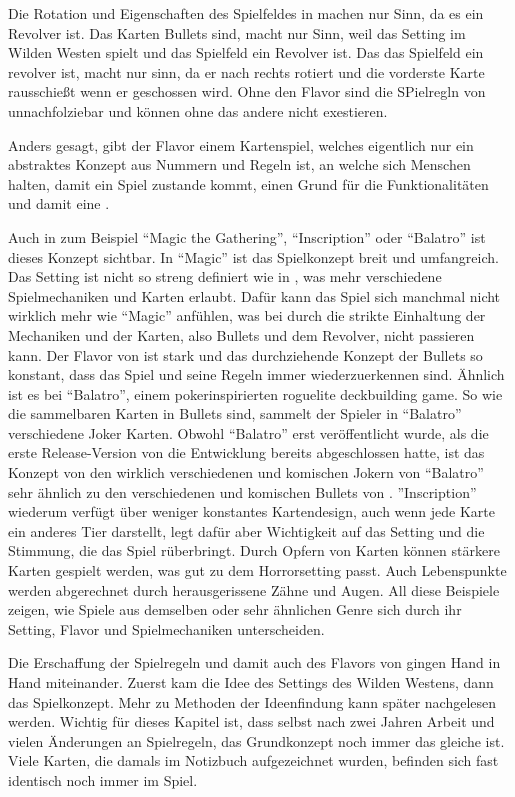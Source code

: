 Die Rotation und Eigenschaften des Spielfeldes in \FF machen nur Sinn, da es ein Revolver ist.
Das Karten Bullets sind, macht nur Sinn, weil das Setting im Wilden Westen spielt und das Spielfeld ein Revolver ist.
Das das Spielfeld ein revolver ist, macht nur sinn, da er nach rechts rotiert und die vorderste Karte rausschießt wenn er geschossen wird.
Ohne den Flavor sind die SPielregln von \FF unnachfolziebar und können ohne das andere nicht exestieren.


Anders gesagt, gibt der Flavor einem Kartenspiel, welches eigentlich nur ein abstraktes Konzept aus Nummern und Regeln ist,
an welche sich Menschen halten, damit ein Spiel zustande kommt, einen Grund für die Funktionalitäten und damit eine .


Auch in zum Beispiel “Magic the Gathering”, “Inscription” oder “Balatro” ist dieses Konzept sichtbar. In “Magic” ist das Spielkonzept breit und umfangreich.
Das Setting ist nicht so streng definiert wie in \FF, was mehr verschiedene Spielmechaniken und Karten erlaubt.
Dafür kann das Spiel sich manchmal nicht wirklich mehr wie “Magic” anfühlen,
was bei \FF durch die strikte Einhaltung der Mechaniken und der Karten, also Bullets und dem Revolver, nicht passieren kann.
Der Flavor von \FF ist stark und das durchziehende Konzept der Bullets so konstant, dass das Spiel und seine Regeln immer
wiederzuerkennen sind. Ähnlich ist es bei “Balatro”, einem pokerinspirierten roguelite deckbuilding game.
So wie die sammelbaren Karten in \FF Bullets sind, sammelt der Spieler in “Balatro” verschiedene Joker Karten.
Obwohl “Balatro” erst veröffentlicht wurde, als die erste Release-Version von \FF die Entwicklung bereits abgeschlossen hatte,
ist das Konzept von den wirklich verschiedenen und komischen Jokern von “Balatro” sehr ähnlich zu den verschiedenen und
komischen Bullets von \FF.
”Inscription” wiederum verfügt über weniger konstantes Kartendesign, auch wenn jede Karte ein anderes Tier darstellt,
legt dafür aber Wichtigkeit auf das Setting und die Stimmung, die das Spiel rüberbringt. Durch Opfern von Karten können stärkere Karten
gespielt werden, was gut zu dem Horrorsetting passt. Auch Lebenspunkte werden abgerechnet durch herausgerissene Zähne und Augen.
All diese Beispiele zeigen, wie Spiele aus demselben oder sehr ähnlichen Genre sich durch ihr Setting, Flavor und Spielmechaniken unterscheiden.


Die Erschaffung der Spielregeln und damit auch des Flavors von \FF gingen Hand in Hand miteinander.
Zuerst kam die Idee des Settings des Wilden Westens, dann das Spielkonzept. Mehr zu Methoden der Ideenfindung kann später
nachgelesen werden. Wichtig für dieses Kapitel ist, dass selbst nach zwei Jahren Arbeit und vielen Änderungen an Spielregeln,
das Grundkonzept noch immer das gleiche ist. Viele Karten, die damals im Notizbuch aufgezeichnet wurden, befinden sich
fast identisch noch immer im Spiel.



